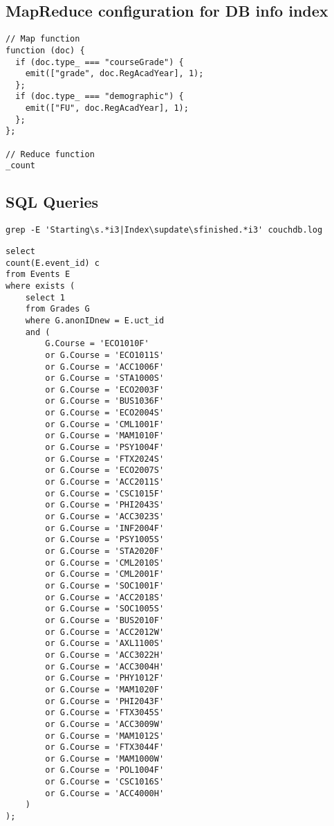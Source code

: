 \subsection{MapReduce configuration for DB info index}
\label{appendix:dbInfo}
\begin{verbatim}
// Map function
function (doc) {
  if (doc.type_ === "courseGrade") {
    emit(["grade", doc.RegAcadYear], 1);  
  };
  if (doc.type_ === "demographic") {
    emit(["FU", doc.RegAcadYear], 1);
  };
};

// Reduce function
_count
\end{verbatim}













\subsection{SQL Queries}
\label{appendix:sql}

\begin{verbatim}
grep -E 'Starting\s.*i3|Index\supdate\sfinished.*i3' couchdb.log
\end{verbatim}


\begin{verbatim}
select
count(E.event_id) c 
from Events E
where exists (
    select 1
    from Grades G
    where G.anonIDnew = E.uct_id
    and (
        G.Course = 'ECO1010F'
        or G.Course = 'ECO1011S'
        or G.Course = 'ACC1006F'
        or G.Course = 'STA1000S'
        or G.Course = 'ECO2003F'
        or G.Course = 'BUS1036F'
        or G.Course = 'ECO2004S'
        or G.Course = 'CML1001F'
        or G.Course = 'MAM1010F'
        or G.Course = 'PSY1004F'
        or G.Course = 'FTX2024S'
        or G.Course = 'ECO2007S'
        or G.Course = 'ACC2011S'
        or G.Course = 'CSC1015F'
        or G.Course = 'PHI2043S'
        or G.Course = 'ACC3023S'
        or G.Course = 'INF2004F'
        or G.Course = 'PSY1005S'
        or G.Course = 'STA2020F'
        or G.Course = 'CML2010S'
        or G.Course = 'CML2001F'
        or G.Course = 'SOC1001F'
        or G.Course = 'ACC2018S'
        or G.Course = 'SOC1005S'
        or G.Course = 'BUS2010F'
        or G.Course = 'ACC2012W'
        or G.Course = 'AXL1100S'
        or G.Course = 'ACC3022H'
        or G.Course = 'ACC3004H'
        or G.Course = 'PHY1012F'
        or G.Course = 'MAM1020F'
        or G.Course = 'PHI2043F'
        or G.Course = 'FTX3045S'
        or G.Course = 'ACC3009W'
        or G.Course = 'MAM1012S'
        or G.Course = 'FTX3044F'
        or G.Course = 'MAM1000W'
        or G.Course = 'POL1004F'
        or G.Course = 'CSC1016S'
        or G.Course = 'ACC4000H'
    )
);
\end{verbatim}